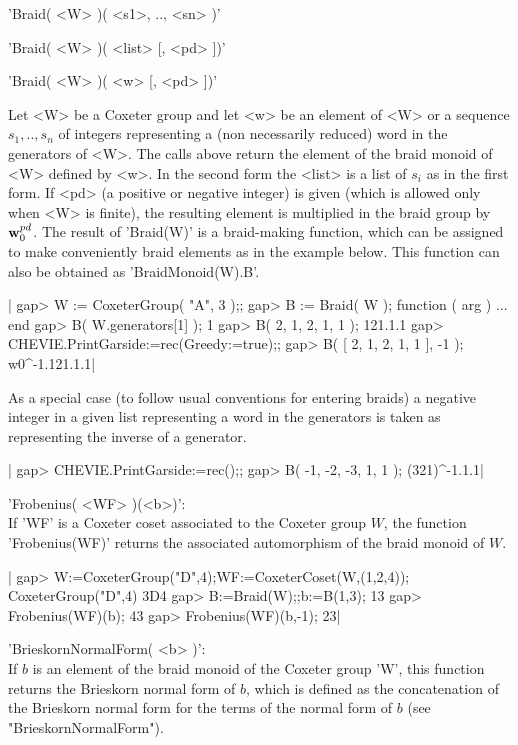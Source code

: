 'Braid( <W> )( <s1>, .., <sn> )'

'Braid( <W> )( <list> [, <pd> ])'

'Braid( <W> )( <w> [, <pd> ])'

Let  <W> be a Coxeter group and let <w>  be an element of <W> or a sequence
$s_1,..,s_n$  of integers representing a  (non necessarily reduced) word in
the  generators of  <W>. The  calls above  return the  element of the braid
monoid  of <W> defined by <w>.  In the second form the  <list> is a list of
$s_i$  as in the  first form. If  <pd> (a positive  or negative integer) is
given  (which is allowed only when <W> is finite), the resulting element is
multiplied  in the braid group by ${\bf w}_0^{pd}$. The result of 'Braid(W)' is
a  braid-making function, which can be  assigned to make conveniently braid
elements  as in the  example below. This  function can also  be obtained as
'BraidMonoid(W).B'.

|    gap> W := CoxeterGroup( "A", 3 );;
    gap> B := Braid( W );
    function ( arg ) ... end
    gap> B( W.generators[1] );
    1
    gap> B( 2, 1, 2, 1, 1 );
    121.1.1
    gap> CHEVIE.PrintGarside:=rec(Greedy:=true);;
    gap> B( [ 2, 1, 2, 1, 1 ], -1 );
    w0^-1.121.1.1|

As  a  special  case  (to  follow  usual conventions for entering braids) a
negative  integer in a given list representing  a word in the generators is
taken as representing the inverse of a generator.

|    gap> CHEVIE.PrintGarside:=rec();;
    gap> B( -1, -2, -3, 1, 1 );
    (321)^-1.1.1|


'Frobenius(  <WF> )(<b>)':\\ If  'WF' is a  Coxeter coset associated to the
Coxeter  group  $W$,  the  function  'Frobenius(WF)' returns the associated
automorphism of the braid monoid of $W$.

|    gap> W:=CoxeterGroup("D",4);WF:=CoxeterCoset(W,(1,2,4));
    CoxeterGroup("D",4)
    3D4
    gap> B:=Braid(W);;b:=B(1,3);
    13
    gap> Frobenius(WF)(b);
    43
    gap> Frobenius(WF)(b,-1);
    23|

'BrieskornNormalForm( <b> )':\\ If $b$ is an element of the braid monoid of
the  Coxeter group 'W', this function  returns the Brieskorn normal form of
$b$, which is defined as the concatenation of the Brieskorn normal form for
the terms of the normal form of $b$ (see "BrieskornNormalForm").

